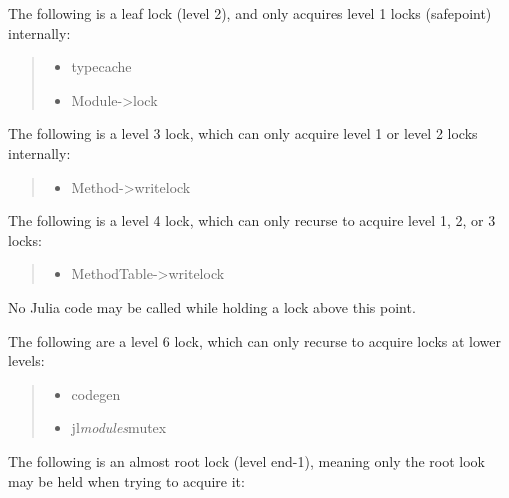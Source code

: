 The following is a leaf lock (level 2), and only acquires level 1 locks (safepoint) internally:



\begin{quote}
\begin{itemize}
\item typecache


\item Module->lock

\end{itemize}
\end{quote}


The following is a level 3 lock, which can only acquire level 1 or level 2 locks internally:



\begin{quote}
\begin{itemize}
\item Method->writelock

\end{itemize}
\end{quote}


The following is a level 4 lock, which can only recurse to acquire level 1, 2, or 3 locks:



\begin{quote}
\begin{itemize}
\item MethodTable->writelock

\end{itemize}
\end{quote}


No Julia code may be called while holding a lock above this point.



The following are a level 6 lock, which can only recurse to acquire locks at lower levels:



\begin{quote}
\begin{itemize}
\item codegen


\item jl\emph{modules}mutex

\end{itemize}
\end{quote}


The following is an almost root lock (level end-1), meaning only the root look may be held when trying to acquire it:



